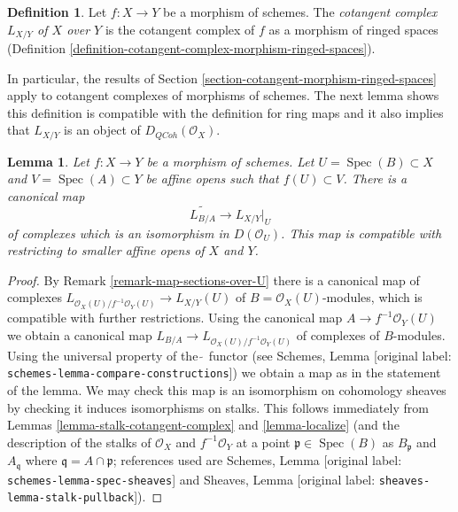 \documentclass[10pt,a4paper]{article}
\theoremstyle{plain}
\newtheorem{lemma}[subsection]{Lemma}
\theoremstyle{definition}
\newtheorem{definition}[subsection]{Definition}
\theoremstyle{remark}
\numberwithin{equation}{subsection}
\def\Spec{\mathop{\mathrm{Spec}}}
\def\QCoh{\mathit{QCoh}}
\begin{document}
\begin{definition}
\label{definition-cotangent-morphism-schemes}
Let $f : X \to Y$ be a morphism of schemes. The {\it cotangent complex
$L_{X/Y}$ of $X$ over $Y$} is the cotangent complex of $f$ as a
morphism of ringed spaces
(Definition \ref{definition-cotangent-complex-morphism-ringed-spaces}).
\end{definition}

\noindent
In particular, the results of
Section \ref{section-cotangent-morphism-ringed-spaces} apply
to cotangent complexes of morphisms of schemes.
The next lemma shows this definition is compatible with the definition
for ring maps and it also implies that $L_{X/Y}$ is an
object of $D_\QCoh(\mathcal{O}_X)$.

\begin{lemma}
\label{lemma-morphism-affine-schemes}
Let $f : X \to Y$ be a morphism of schemes. Let $U = \Spec(B) \subset X$
and $V = \Spec(A) \subset Y$ be affine opens such that $f(U) \subset V$.
There is a canonical map
$$
\widetilde{L_{B/A}} \longrightarrow L_{X/Y}|_U
$$
of complexes which is an isomorphism in $D(\mathcal{O}_U)$.
This map is compatible with restricting to smaller affine opens
of $X$ and $Y$.
\end{lemma}

\begin{proof}
By Remark \ref{remark-map-sections-over-U}
there is a canonical map of complexes
$L_{\mathcal{O}_X(U)/f^{-1}\mathcal{O}_Y(U)} \to L_{X/Y}(U)$
of $B = \mathcal{O}_X(U)$-modules, which is compatible
with further restrictions. Using the canonical map
$A \to f^{-1}\mathcal{O}_Y(U)$ we obtain a canonical map
$L_{B/A} \to L_{\mathcal{O}_X(U)/f^{-1}\mathcal{O}_Y(U)}$
of complexes of $B$-modules.
Using the universal property of the $\widetilde{\ }$
functor (see Schemes, Lemma \textnormal{[original label: \nolinkurl{schemes-lemma-compare-constructions}]})
we obtain a map as in the statement of the lemma.
We may check this map is an isomorphism on cohomology sheaves
by checking it induces isomorphisms on stalks.
This follows immediately from
Lemmas \ref{lemma-stalk-cotangent-complex} and \ref{lemma-localize}
(and the description of the stalks of
$\mathcal{O}_X$ and $f^{-1}\mathcal{O}_Y$
at a point $\mathfrak p \in \Spec(B)$ as $B_\mathfrak p$ and
$A_\mathfrak q$ where $\mathfrak q = A \cap \mathfrak p$; references
used are Schemes, Lemma \textnormal{[original label: \nolinkurl{schemes-lemma-spec-sheaves}]}
and
Sheaves, Lemma \textnormal{[original label: \nolinkurl{sheaves-lemma-stalk-pullback}]}).
\end{proof}
\end{document}
